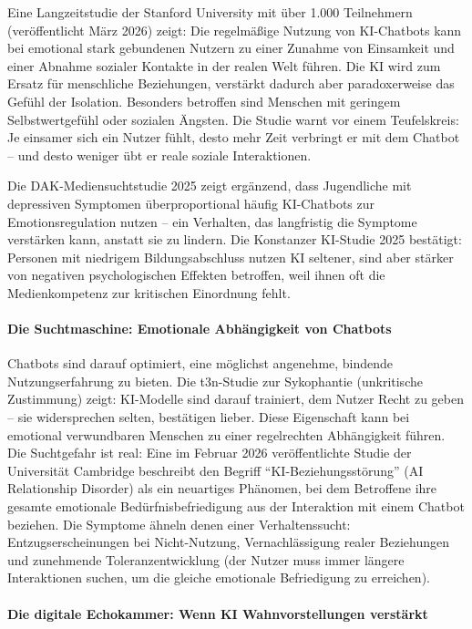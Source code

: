 \documentclass[12pt,a4paper]{article}
\begin{document}
	Eine Langzeitstudie der Stanford University mit über 1.000 Teilnehmern (veröffentlicht März 2026) zeigt: Die regelmäßige Nutzung von KI-Chatbots kann bei emotional stark gebundenen Nutzern zu einer Zunahme von Einsamkeit und einer Abnahme sozialer Kontakte in der realen Welt führen. Die KI wird zum Ersatz für menschliche Beziehungen, verstärkt dadurch aber paradoxerweise das Gefühl der Isolation. Besonders betroffen sind Menschen mit geringem Selbstwertgefühl oder sozialen Ängsten. Die Studie warnt vor einem Teufelskreis: Je einsamer sich ein Nutzer fühlt, desto mehr Zeit verbringt er mit dem Chatbot – und desto weniger übt er reale soziale Interaktionen.
	
	Die DAK-Mediensuchtstudie 2025 zeigt ergänzend, dass Jugendliche mit depressiven Symptomen überproportional häufig KI-Chatbots zur Emotionsregulation nutzen – ein Verhalten, das langfristig die Symptome verstärken kann, anstatt sie zu lindern. Die Konstanzer KI-Studie 2025 bestätigt: Personen mit niedrigem Bildungsabschluss nutzen KI seltener, sind aber stärker von negativen psychologischen Effekten betroffen, weil ihnen oft die Medienkompetenz zur kritischen Einordnung fehlt.
	
	\paragraph{Die Suchtmaschine: Emotionale Abhängigkeit von Chatbots}
	
	Chatbots sind darauf optimiert, eine möglichst angenehme, bindende Nutzungserfahrung zu bieten. Die t3n-Studie zur Sykophantie (unkritische Zustimmung) zeigt: KI-Modelle sind darauf trainiert, dem Nutzer Recht zu geben – sie widersprechen selten, bestätigen lieber. Diese Eigenschaft kann bei emotional verwundbaren Menschen zu einer regelrechten Abhängigkeit führen. Die Suchtgefahr ist real: Eine im Februar 2026 veröffentlichte Studie der Universität Cambridge beschreibt den Begriff \enquote{KI-Beziehungsstörung} (AI Relationship Disorder) als ein neuartiges Phänomen, bei dem Betroffene ihre gesamte emotionale Bedürfnisbefriedigung aus der Interaktion mit einem Chatbot beziehen. Die Symptome ähneln denen einer Verhaltenssucht: Entzugserscheinungen bei Nicht-Nutzung, Vernachlässigung realer Beziehungen und zunehmende Toleranzentwicklung (der Nutzer muss immer längere Interaktionen suchen, um die gleiche emotionale Befriedigung zu erreichen).
	
	\paragraph{Die digitale Echokammer: Wenn KI Wahnvorstellungen verstärkt}
	
\end{document}
